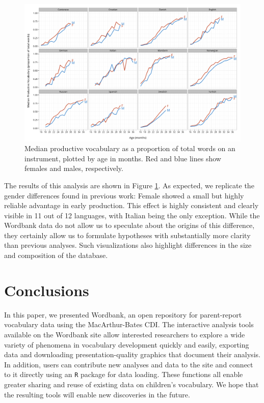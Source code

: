 \documentclass[man,noapacite]{apa}
\begin{document}
\begin{figure}[ht!]
\includegraphics[width=6in]{figures/gender.png}
\caption{\label{fig:gender} Median productive vocabulary as a proportion of total words on an instrument, plotted by age in months. Red and blue lines show females and males, respectively.}
\end{figure}

The results of this analysis are shown in Figure \ref{fig:gender}. As expected, we replicate the gender differences found in previous work: Female showed a small but highly reliable advantage in early production. This effect is highly consistent and clearly visible in 11 out of 12 languages, with Italian being the only exception. While the Wordbank data do not allow us to speculate about the origins of this difference, they certainly allow us to formulate hypotheses with substantially more clarity than previous analyses. Such visualizations also highlight differences in the size and composition of the database.

\section{Conclusions}

In this paper, we presented Wordbank, an open repository for parent-report vocabulary data using the MacArthur-Bates CDI. The interactive analysis tools available on the Wordbank site allow interested researchers to explore a wide variety of phenomena in vocabulary development quickly and easily, exporting data and downloading presentation-quality graphics that document their analysis. In addition, users can contribute new analyses and data to the site and connect to it directly using an \texttt{R} package for data loading. These functions all enable greater sharing and reuse of existing data on children's vocabulary. We hope that the resulting tools will enable new discoveries in the future.



\end{document}

